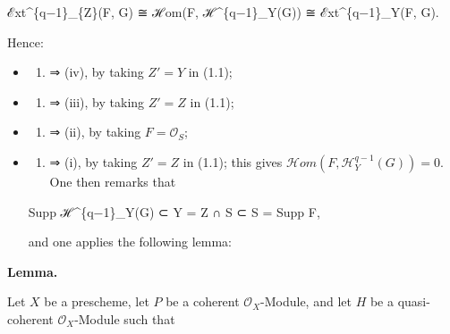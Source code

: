 \documentclass[
  11pt,
  a4paper,
]{book}
\newenvironment{Shaded}{}{}
\newcommand{\NormalTok}[1]{#1}
\providecommand{\tightlist}{%
  \setlength{\itemsep}{0pt}\setlength{\parskip}{0pt}}
\begin{document}
\begin{Shaded}
\begin{Highlighting}[]
\NormalTok{ℰxt\^{}\{q−1\}\_\{Z\textquotesingle{}\}(F, G) ≅ ℋom(F, ℋ\^{}\{q−1\}\_Y(G)) ≅ ℰxt\^{}\{q−1\}\_Y(F, G).}
\end{Highlighting}
\end{Shaded}

Hence:

\begin{itemize}
\item
  \begin{enumerate}
  \def\labelenumi{(\roman{enumi})}
  \tightlist
  \item
    ⇒ (iv), by taking \(Z' = Y\) in (1.1);
  \end{enumerate}
\item
  \begin{enumerate}
  \def\labelenumi{(\roman{enumi})}
  \setcounter{enumi}{3}
  \tightlist
  \item
    ⇒ (iii), by taking \(Z' = Z\) in (1.1);
  \end{enumerate}
\item
  \begin{enumerate}
  \def\labelenumi{(\roman{enumi})}
  \setcounter{enumi}{2}
  \tightlist
  \item
    ⇒ (ii), by taking \(F = \mathcal{O}_{S}\);
  \end{enumerate}
\item
  \begin{enumerate}
  \def\labelenumi{(\roman{enumi})}
  \setcounter{enumi}{1}
  \tightlist
  \item
    ⇒ (i), by taking \(Z' = Z\) in (1.1); this gives
    \(\mathcal{H}om(F, \mathcal{H}^{q-1}_{Y}(G)) = 0\). One then remarks
    that
  \end{enumerate}

\begin{Shaded}
\begin{Highlighting}[]
\NormalTok{Supp ℋ\^{}\{q−1\}\_Y(G) ⊂ Y = Z ∩ S ⊂ S = Supp F,}
\end{Highlighting}
\end{Shaded}

  and one applies the following lemma:
\end{itemize}

\textbf{Lemma.}

Let \(X\) be a prescheme, let \(P\) be a coherent
\(\mathcal{O}_{X}\)-Module, and let \(H\) be a quasi-coherent
\(\mathcal{O}_{X}\)-Module such that
\end{document}
